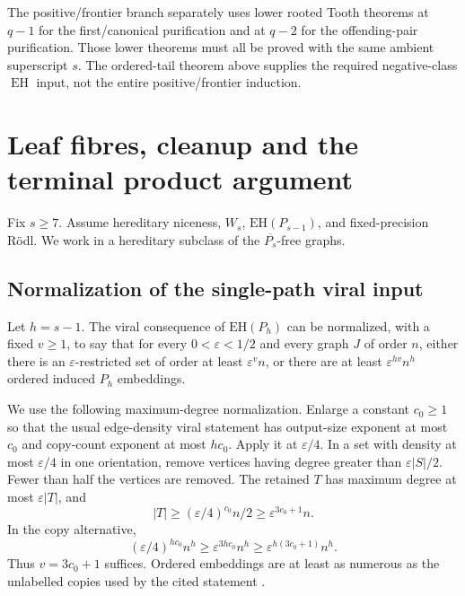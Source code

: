 \documentclass[11pt,a4paper]{article}
\theoremstyle{definition}
\theoremstyle{remark}
\numberwithin{equation}{section}
\newcommand{\EH}{\mathrm{EH}}
\begin{document}
The positive/frontier branch separately uses lower rooted Tooth theorems at \(q-1\) for the first/canonical purification and at \(q-2\) for the offending-pair purification. Those lower theorems must all be proved with the same ambient superscript \(s\). The ordered-tail theorem above supplies the required negative-class \(\operatorname{EH}\) input, not the entire positive/frontier induction.

\section{Leaf fibres, cleanup and the terminal product argument}\label{app:terminal}
Fix \(s\ge7\). Assume hereditary niceness, \(W_s\), \(\EH(P_{s-1})\), and fixed-precision R\"odl. We work in a hereditary subclass of the \(\overline{P_s}\)-free graphs.

\subsection{Normalization of the single-path viral input}
Let \(h=s-1\). The viral consequence of \(\EH(P_h)\) can be normalized, with a fixed \(v\ge1\), to say that for every \(0<\varepsilon<1/2\) and every graph \(J\) of order \(n\), either there is an \(\varepsilon\)-restricted set of order at least \(\varepsilon^v n\), or there are at least \(\varepsilon^{hv}n^h\) ordered induced \(P_h\) embeddings.

We use the following maximum-degree normalization. Enlarge a constant \(c_0\ge1\) so that the usual edge-density viral statement has output-size exponent at most \(c_0\) and copy-count exponent at most \(hc_0\). Apply it at \(\varepsilon/4\). In a set with density at most \(\varepsilon/4\) in one orientation, remove vertices having degree greater than \(\varepsilon|S|/2\). Fewer than half the vertices are removed. The retained \(T\) has maximum degree at most \(\varepsilon|T|\), and
\[
 |T|\ge (\varepsilon/4)^{c_0}n/2\ge\varepsilon^{3c_0+1}n.
\]
In the copy alternative,
\[
 (\varepsilon/4)^{hc_0}n^h\ge\varepsilon^{3hc_0}n^h
 \ge\varepsilon^{h(3c_0+1)}n^h.
\]
Thus \(v=3c_0+1\) suffices. Ordered embeddings are at least as numerous as the unlabelled copies used by the cited statement \cite{bfp}.
\end{document}

